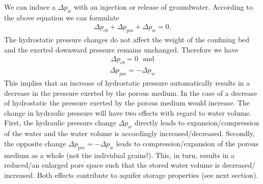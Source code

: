 \documentclass[letterpaper,10pt,english]{jupyterBook}
\begin{document}
\sphinxAtStartPar
We can induce a  \(\Delta p_w\) with an injection or release of groundwater. According to the above equation we can formulate
\begin{equation*}
\begin{split}
\Delta p_{cb} + \Delta p_{pm} + \Delta p_w = 0.
\end{split}
\end{equation*}
\sphinxAtStartPar
The hydrostatic pressure changes do not affect the weight of the confining bed and the exerted downward pressure remains unchanged. Therefore we have
\begin{equation*}
\begin{split}
\Delta p_{cb} = 0 \:\:\: \text{and}
\end{split}
\end{equation*}\begin{equation*}
\begin{split}
\Delta p_{pm} = -\Delta p_w
\end{split}
\end{equation*}
\sphinxAtStartPar
This implies that an increase of hydrostatic pressure automatically results in a decrease in the pressure exerted by the porous medium. In the case of a decrease of hydrostatic the pressure exerted by the porous medium would increase.
The change in hydraulic pressure will have two effects with regard to water volume. First, the hydraulic pressure change \(\Delta p_w\) directly leads to expansion/compression of the water and the water volume is accordingly increased/decreased. Secondly, the opposite change \(\Delta p_{pm} = -\Delta p_w\) leads to compression/expansion of the porous medium as a whole (not the individual grains!). This, in turn, results in a reduced/an enlarged pore space such that the stored water volume is decreased/ increased. Both effects contribute to aquifer storage properties (see next section).
\end{document}
